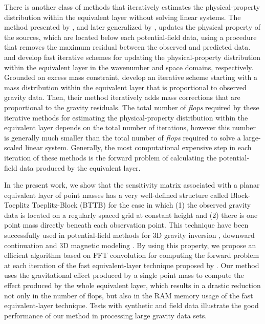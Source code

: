 There is another class of methods that iteratively estimates the physical-property distribution within 
the equivalent layer without solving linear systems.
The method presented by \citet{cordell1992}, and later generalized by \citet{guspi-novara2009}, updates 
the physical property of the sources, which are located below each potential-field data, using a 
procedure that removes the maximum residual between the observed and predicted data.
\citet{xia-sprowl1991} and \citet{xia-etal1993} develop 
fast iterative schemes for updating the physical-property distribution
within the equivalent layer in the wavenumber and space domains, respectively.
Grounded on excess mass constraint, \cite{siqueira-etal2017} develop an iterative scheme 
starting with a mass distribution within the equivalent layer that is proportional to observed gravity data.
Then, their method iteratively adds mass corrections that are proportional to the gravity residuals.
The total number of \textit{flops} required by these iterative methods for estimating the physical-property 
distribution within the equivalent layer depends on the total number of iterations, however this number is 
generally much smaller than the total number of \textit{flops} required to solve a large-scaled linear system. 
Generally, the most computational expensive step in each iteration of these methods is the forward problem 
of calculating the potential-field data produced by the equivalent layer.

In the present work, we show that the sensitivity matrix associated with a planar equivalent layer 
of point masses has a very well-defined structure called Block-Toeplitz Toeplitz-Block (BTTB) for 
the case in which (1) the observed gravity data is located on a regularly spaced grid at constant 
height and (2) there is one point mass directly beneath each observation point.
This technique have been successfully used in potential-field methods for 
3D gravity inversion \citep{zhang-wong2015}, downward continuation 
\citep{zhang-etal2016} and 3D magnetic modeling \citep{qiang_etal2019}.
By using this property, we propose an efficient algorithm based on FFT convolution 
\citep[e.g.,][ p. 207]{vanloan1992} for computing the forward problem at each iteration of 
the fast equivalent-layer technique proposed by \citet{siqueira-etal2017}.
Our method uses the gravitational effect produced by a single point mass to compute the 
effect produced by the whole equivalent layer, which results in a drastic reduction 
not only in the number of flops, but also in the RAM memory usage of the fast equivalent-layer technique.
Tests with synthetic and field data illustrate the good performance of our method in processing 
large gravity data sets.



